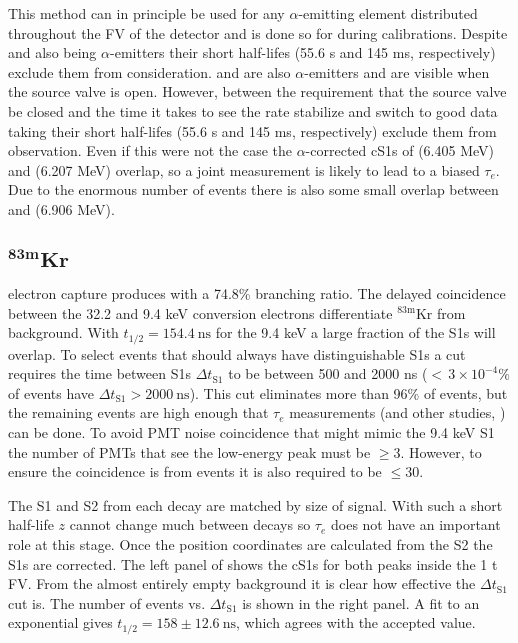 This method can in principle be used for any $\alpha$-emitting element distributed throughout the FV of the detector and is done so
for  during  calibrations.  Despite  and  also being $\alpha$-emitters their short
half-lifes (55.6 s and 145 ms, respectively) exclude them from consideration.   and  are also $\alpha$-emitters
and are visible when the source valve is open.  However, between the requirement that the source valve be closed and the time it takes to
see
the rate stabilize and switch to good data taking their short half-lifes (55.6 s and 145 ms, respectively) exclude them from
observation.  Even if this were not the case the $\alpha$-corrected cS1s of  (6.405 MeV) and  (6.207 MeV)
overlap, so a joint
measurement is likely to lead to a biased $\tau_e$.  Due to the enormous number of events there is also some small overlap between
 and  (6.906 MeV).



\subsection[$\mathrm{^{83m}Kr}$][$\mathrm{^{83m}Kr}$]{$\mathbf{^{83m}Kr}$}
\label{subsec:electron_lifetimes_measurement_kr}
 electron capture produces \metakr with a 74.8\% branching ratio.  The delayed coincidence between the 32.2 and 9.4 keV
conversion electrons differentiate $\mathrm{^{83m}Kr}$ from background.  With
$t_{1/2} = 154.4\ \mathrm{ns}$ for the 9.4 keV a large fraction of the S1s will overlap.  To select events that should always have
distinguishable S1s a cut requires
the time between S1s $\Delta t_{\mathrm{S1}}$ to be between 500 and 2000 ns (${<}\, 3 \times 10^{-4}\%$ of events have
$\Delta t_{\mathrm{S1}} > 2000\ \mathrm{ns}$).  This cut eliminates more than 96\% of \metakr events, but the remaining events are high
enough that $\tau_e$ measurements (and other studies, ) can be done.  To avoid PMT noise coincidence that might mimic
the 9.4 keV S1
the number of PMTs that see the low-energy peak must be $\geq 3$.  However, to ensure the coincidence is from \metakr events it is also
required to be $\leq 30$.

The S1 and S2 from each decay are matched by size of signal.  With such a short half-life $z$ cannot change much between decays so
$\tau_e$ does not have an important role at this stage.  Once the position coordinates are calculated from the S2 the S1s are
corrected.  The left panel of  shows the cS1s for both peaks inside the
1 t FV.  From the
almost entirely empty background it is clear how effective the $\Delta t_{\mathrm{S1}}$ cut is.  The number of events vs.
$\Delta t_{\mathrm{S1}}$ is shown in the right panel.  A fit to an exponential gives $t_{1/2} = 158 \pm 12.6\ \mathrm{ns}$, which
agrees with the accepted value.

